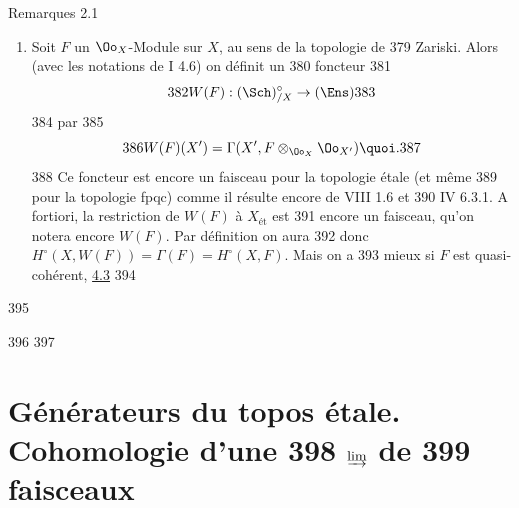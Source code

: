 \begin{enonce*}[remark]{Remarques 2.1}
\begin{enumerate}
   356	  un groupe commutatif ordinaire, on écrira simplement $H^{i}(X, G)$
   357	  au lieu de $H^{i}(X, G_X)$. Supposons, par exemple, que $G$ soit un
   358	  groupe fini, alors $G_X$ est fini donc affine sur $X$, donc en
   359	  utilisant la remarque finale de a) on obtient une interprétation de
   360	  $H^{1} (X, G)$ comme l'ensemble \emph{des classes de revêtements
   361	  principaux galoisiens de groupe $G$} ( V 2.7). Lorsque $X$ est
   362	  connexe et muni d'un point géométrique $a$, alors en termes du «   groupes fondamental » $\pi_1 (X, a)$ ( V 7) on obtient
   363	  l'isomorphisme canonique
   364	\begin{equation*}
   365	H^1(X, G) \simeq \Hom(\pi_1(X, a), G){\quoi},\tag{${\ast}{\ast}$}
   366	\end{equation*}
   367	(où on a supposé $G$ commutatif).
   368	
   369	On peut dire qu'en passant de la cohomologie de Zariski à la topologie
   370	étale, « on a fait ce qu'il fallait » pour obtenir « le bon »
   371	$H^1$ (qui figure au 2ème\pageoriginale membre de $(\ast)$) pour un groupe de
   372	coefficients constant fini $G$. \emph{C'est un fait remarquable, qui sera
   373	démontré par la suite de ce séminaire, que cela suffit également pour
   374	trouver les « bons » $H^{i} (X, G)$  pour tout groupe de coefficients
   375	de torsion (du moins si $G$ est premier aux caractéristiques
   376	résiduelles de $X$)}.
   377	
   378	\item Soit $F$ un $\Oo_X$-Module sur $X$, au sens de la topologie de
   379	Zariski. Alors (avec les notations de  I 4.6) on définit un
   380	foncteur
   381	$$
   382	W(F) : (\Sch)_{/X}^\circ \to (\Ens)
   383	$$
   384	par
   385	$$
   386	W(F)(X') = \Gamma (X', F \otimes_{\Oo_{X}} \Oo_{X'}){\quoi}.
   387	$$
   388	Ce foncteur est encore un faisceau pour la topologie étale (et même
   389	pour la topologie fpqc) comme il résulte encore de  VIII 1.6 et
   390	 IV 6.3.1. A fortiori, la restriction de $W(F)$ à $X_{\text{ét}}$ est
   391	encore un faisceau, qu'on notera encore $W(F)$. Par définition on aura
   392	donc $H^{\circ} (X, W(F)) = \Gamma(F) = H^{\circ} (X, F)$. Mais on a
   393	mieux si $F$ est quasi-cohérent, \cf \hyperref[VII.prop4.3]{4.3}
   394	\end{enumerate}
   395	\end{enonce*}
   396	
   397	\section{Générateurs du topos étale. Cohomologie d'une
   398	  $\protect\varinjlim$ de
   399	  faisceaux}
